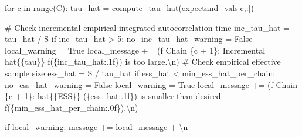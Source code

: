 \documentclass[
  letterpaper,
  DIV=11,
  numbers=noendperiod]{scrartcl}
\newenvironment{Shaded}{\begin{snugshade}}{\end{snugshade}}
\newcommand{\BuiltInTok}[1]{\textcolor[rgb]{0.00,0.23,0.31}{#1}}
\newcommand{\CharTok}[1]{\textcolor[rgb]{0.13,0.47,0.30}{#1}}
\newcommand{\CommentTok}[1]{\textcolor[rgb]{0.37,0.37,0.37}{#1}}
\newcommand{\ControlFlowTok}[1]{\textcolor[rgb]{0.00,0.23,0.31}{#1}}
\newcommand{\DecValTok}[1]{\textcolor[rgb]{0.68,0.00,0.00}{#1}}
\newcommand{\KeywordTok}[1]{\textcolor[rgb]{0.00,0.23,0.31}{#1}}
\newcommand{\NormalTok}[1]{\textcolor[rgb]{0.00,0.23,0.31}{#1}}
\newcommand{\OperatorTok}[1]{\textcolor[rgb]{0.37,0.37,0.37}{#1}}
\newcommand{\SpecialCharTok}[1]{\textcolor[rgb]{0.37,0.37,0.37}{#1}}
\newcommand{\SpecialStringTok}[1]{\textcolor[rgb]{0.13,0.47,0.30}{#1}}
\newcommand{\StringTok}[1]{\textcolor[rgb]{0.13,0.47,0.30}{#1}}
\newcommand{\VariableTok}[1]{\textcolor[rgb]{0.07,0.07,0.07}{#1}}
\begin{document}
\begin{Shaded}
\begin{Highlighting}[]
    \ControlFlowTok{for}\NormalTok{ c }\KeywordTok{in} \BuiltInTok{range}\NormalTok{(C):}
\NormalTok{      tau\_hat }\OperatorTok{=}\NormalTok{ compute\_tau\_hat(expectand\_vals[c,:])}

      \CommentTok{\# Check incremental empirical integrated autocorrelation time}
\NormalTok{      inc\_tau\_hat }\OperatorTok{=}\NormalTok{ tau\_hat }\OperatorTok{/}\NormalTok{ S}
      \ControlFlowTok{if}\NormalTok{ inc\_tau\_hat }\OperatorTok{\textgreater{}} \DecValTok{5}\NormalTok{:}
\NormalTok{        no\_inc\_tau\_hat\_warning }\OperatorTok{=} \VariableTok{False}
\NormalTok{        local\_warning }\OperatorTok{=} \VariableTok{True}
\NormalTok{        local\_message }\OperatorTok{+=}\NormalTok{ (}\SpecialStringTok{f\textquotesingle{}  Chain }\SpecialCharTok{\{}\NormalTok{c }\OperatorTok{+} \DecValTok{1}\SpecialCharTok{\}}\SpecialStringTok{: Incremental hat}\CharTok{\{\{}\SpecialStringTok{tau}\CharTok{\}\}}\SpecialStringTok{ \textquotesingle{}}
                          \SpecialStringTok{f\textquotesingle{}(}\SpecialCharTok{\{}\NormalTok{inc\_tau\_hat}\SpecialCharTok{:.1f\}}\SpecialStringTok{) is too large.}\CharTok{\textbackslash{}n}\SpecialStringTok{\textquotesingle{}}\NormalTok{)}
      \CommentTok{\# Check empirical effective sample size}
\NormalTok{      ess\_hat }\OperatorTok{=}\NormalTok{ S }\OperatorTok{/}\NormalTok{ tau\_hat}
      \ControlFlowTok{if}\NormalTok{ ess\_hat }\OperatorTok{\textless{}}\NormalTok{ min\_ess\_hat\_per\_chain:}
\NormalTok{        no\_ess\_hat\_warning }\OperatorTok{=} \VariableTok{False}
\NormalTok{        local\_warning }\OperatorTok{=} \VariableTok{True}
\NormalTok{        local\_message }\OperatorTok{+=}\NormalTok{ (}\SpecialStringTok{f\textquotesingle{}  Chain }\SpecialCharTok{\{}\NormalTok{c }\OperatorTok{+} \DecValTok{1}\SpecialCharTok{\}}\SpecialStringTok{: hat}\CharTok{\{\{}\SpecialStringTok{ESS}\CharTok{\}\}}\SpecialStringTok{ (}\SpecialCharTok{\{}\NormalTok{ess\_hat}\SpecialCharTok{:.1f\}}\SpecialStringTok{) \textquotesingle{}}
                          \StringTok{\textquotesingle{}is smaller than desired \textquotesingle{}}
                          \SpecialStringTok{f\textquotesingle{}(}\SpecialCharTok{\{}\NormalTok{min\_ess\_hat\_per\_chain}\SpecialCharTok{:.0f\}}\SpecialStringTok{).}\CharTok{\textbackslash{}n}\SpecialStringTok{\textquotesingle{}}\NormalTok{)}

    \ControlFlowTok{if}\NormalTok{ local\_warning:}
\NormalTok{      message }\OperatorTok{+=}\NormalTok{ local\_message }\OperatorTok{+} \StringTok{\textquotesingle{}}\CharTok{\textbackslash{}n}\StringTok{\textquotesingle{}}


\end{Highlighting}
\end{Shaded}
\end{document}

